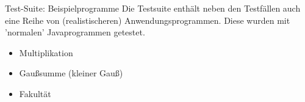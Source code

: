 \begin{frame}{Test-Suite: Beispielprogramme}
Die Testsuite enthält neben den Testfällen auch eine Reihe von (realistischeren) Anwendungsprogrammen. Diese wurden mit 'normalen' Javaprogrammen getestet.

\begin{itemize}
	\item Multiplikation
	\item Gaußsumme (kleiner Gauß)
	\item Fakultät
\end{itemize}	
\end{frame}


